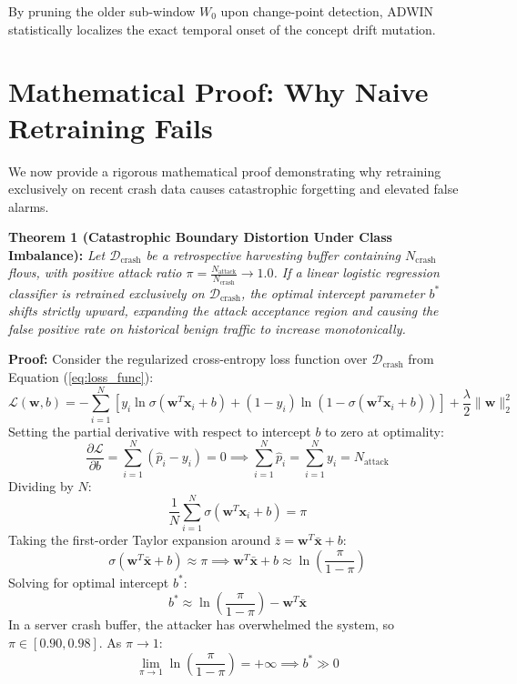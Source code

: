 \documentclass[12pt,a4paper,oneside]{report}
\begin{document}
By pruning the older sub-window $W_0$ upon change-point detection, ADWIN statistically localizes the exact temporal onset of the concept drift mutation.

\section{Mathematical Proof: Why Naive Retraining Fails}
We now provide a rigorous mathematical proof demonstrating why retraining exclusively on recent crash data causes catastrophic forgetting and elevated false alarms.

\noindent \textbf{Theorem 1 (Catastrophic Boundary Distortion Under Class Imbalance):}  
\textit{Let $\mathcal{D}_{\text{crash}}$ be a retrospective harvesting buffer containing $N_{\text{crash}}$ flows, with positive attack ratio $\pi = \frac{N_{\text{attack}}}{N_{\text{crash}}} \to 1.0$. If a linear logistic regression classifier is retrained exclusively on $\mathcal{D}_{\text{crash}}$, the optimal intercept parameter $b^*$ shifts strictly upward, expanding the attack acceptance region and causing the false positive rate on historical benign traffic to increase monotonically.}

\noindent \textbf{Proof:}  
Consider the regularized cross-entropy loss function over $\mathcal{D}_{\text{crash}}$ from Equation (\ref{eq:loss_func}):
\begin{equation}
\mathcal{L}(\mathbf{w}, b) = -\sum_{i=1}^N \left[ y_i \ln \sigma(\mathbf{w}^T \mathbf{x}_i + b) + (1 - y_i) \ln(1 - \sigma(\mathbf{w}^T \mathbf{x}_i + b)) \right] + \frac{\lambda}{2} \|\mathbf{w}\|_2^2
\end{equation}
Setting the partial derivative with respect to intercept $b$ to zero at optimality:
\begin{equation}
\frac{\partial \mathcal{L}}{\partial b} = \sum_{i=1}^N \left( \hat{p}_i - y_i \right) = 0 \implies \sum_{i=1}^N \hat{p}_i = \sum_{i=1}^N y_i = N_{\text{attack}}
\end{equation}
Dividing by $N$:
\begin{equation}
\frac{1}{N} \sum_{i=1}^N \sigma(\mathbf{w}^T \mathbf{x}_i + b) = \pi
\end{equation}
Taking the first-order Taylor expansion around $\bar{z} = \mathbf{w}^T \bar{\mathbf{x}} + b$:
\begin{equation}
\sigma(\mathbf{w}^T \bar{\mathbf{x}} + b) \approx \pi \implies \mathbf{w}^T \bar{\mathbf{x}} + b \approx \ln\left( \frac{\pi}{1 - \pi} \right)
\end{equation}
Solving for optimal intercept $b^*$:
\begin{equation}
b^* \approx \ln\left( \frac{\pi}{1 - \pi} \right) - \mathbf{w}^T \bar{\mathbf{x}}
\end{equation}
In a server crash buffer, the attacker has overwhelmed the system, so $\pi \in [0.90, 0.98]$. As $\pi \to 1$:
\begin{equation}
\lim_{\pi \to 1} \ln\left( \frac{\pi}{1 - \pi} \right) = +\infty \implies b^* \gg 0
\end{equation}
\end{document}
